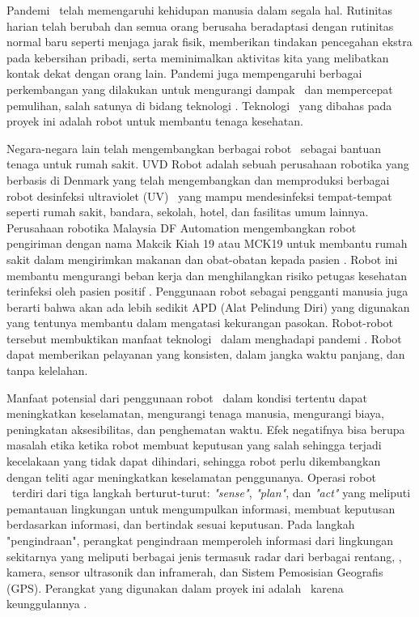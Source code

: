 
Pandemi \covid\ telah memengaruhi kehidupan manusia dalam segala hal. Rutinitas harian telah berubah dan semua orang berusaha beradaptasi dengan rutinitas normal baru seperti menjaga jarak fisik, memberikan tindakan pencegahan ekstra pada kebersihan pribadi, serta meminimalkan aktivitas kita yang melibatkan kontak dekat dengan orang lain. Pandemi juga mempengaruhi berbagai perkembangan yang dilakukan untuk mengurangi dampak \covid\ dan mempercepat pemulihan, salah satunya di bidang teknologi \auto. Teknologi \auto\ yang dibahas pada proyek ini adalah robot untuk membantu tenaga kesehatan. 

Negara-negara lain telah mengembangkan berbagai robot \auto\ sebagai bantuan tenaga untuk rumah sakit. UVD Robot adalah sebuah perusahaan robotika yang berbasis di Denmark yang telah mengembangkan dan memproduksi berbagai robot desinfeksi ultraviolet (UV) \auto\ yang mampu mendesinfeksi tempat-tempat seperti rumah sakit, bandara, sekolah, hotel, dan fasilitas umum lainnya\cite{f1}.
Perusahaan robotika Malaysia DF Automation mengembangkan robot pengiriman dengan nama Makcik Kiah 19 atau MCK19 untuk membantu rumah sakit dalam mengirimkan makanan dan obat-obatan kepada pasien \covid\cite{f2}.
Robot ini membantu mengurangi beban kerja dan menghilangkan risiko petugas kesehatan terinfeksi oleh pasien positif \covid. Penggunaan robot sebagai pengganti manusia juga berarti bahwa akan ada lebih sedikit APD (Alat Pelindung Diri) yang digunakan yang tentunya membantu dalam mengatasi kekurangan pasokan. Robot-robot tersebut membuktikan manfaat teknologi \auto\ dalam menghadapi pandemi \covid. Robot dapat memberikan pelayanan yang konsisten, dalam jangka waktu panjang, dan tanpa kelelahan.

Manfaat potensial dari penggunaan robot \auto\ dalam kondisi tertentu dapat meningkatkan keselamatan, mengurangi tenaga manusia, mengurangi biaya, peningkatan aksesibilitas, dan penghematan waktu. Efek negatifnya bisa berupa masalah etika ketika robot membuat keputusan yang salah sehingga terjadi kecelakaan yang tidak dapat dihindari, sehingga robot perlu dikembangkan dengan teliti agar meningkatkan keselamatan penggunanya.
Operasi robot \auto\ terdiri dari tiga langkah berturut-turut: \textit{"sense"}, \textit{"plan"}, dan \textit{"act"} yang meliputi pemantauan lingkungan untuk mengumpulkan informasi, membuat keputusan berdasarkan informasi, dan bertindak sesuai keputusan\cite{f3}.
Pada langkah "pengindraan", perangkat pengindraan memperoleh informasi dari lingkungan sekitarnya yang meliputi berbagai jenis termasuk radar dari berbagai rentang, \lidar, kamera, sensor ultrasonik dan inframerah, dan Sistem Pemosisian Geografis (GPS). Perangkat yang digunakan dalam proyek ini adalah \lidar\ karena keunggulannya . 

